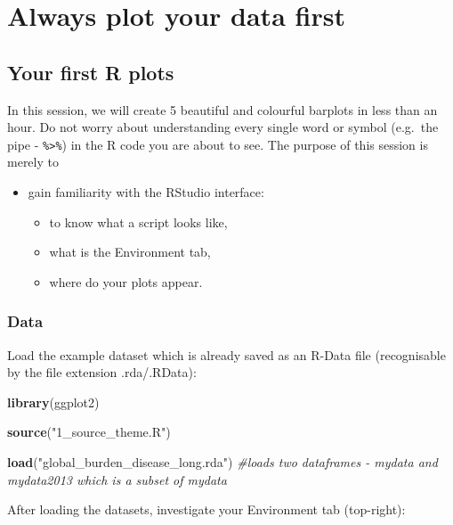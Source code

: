 \documentclass[]{book}
\makeatletter
\newenvironment{Shaded}{\begin{snugshade}}{\end{snugshade}}
\newcommand{\KeywordTok}[1]{\textcolor[rgb]{0.13,0.29,0.53}{\textbf{#1}}}
\newcommand{\StringTok}[1]{\textcolor[rgb]{0.31,0.60,0.02}{#1}}
\newcommand{\CommentTok}[1]{\textcolor[rgb]{0.56,0.35,0.01}{\textit{#1}}}
\newcommand{\NormalTok}[1]{#1}
\providecommand{\tightlist}{%
  \setlength{\itemsep}{0pt}\setlength{\parskip}{0pt}}
\newenvironment{kframe}{%
\medskip{}
\setlength{\fboxsep}{.8em}
 \def\at@end@of@kframe{}%
 \ifinner\ifhmode%
  \def\at@end@of@kframe{\end{minipage}}%
  \begin{minipage}{\columnwidth}%
 \fi\fi%
 \def\FrameCommand##1{\hskip\@totalleftmargin \hskip-\fboxsep
 \colorbox{shadecolor}{##1}\hskip-\fboxsep
     \hskip-\linewidth \hskip-\@totalleftmargin \hskip\columnwidth}%
 \MakeFramed {\advance\hsize-\width
   \@totalleftmargin\z@ \linewidth\hsize
   \@setminipage}}%
 {\par\unskip\endMakeFramed%
 \at@end@of@kframe}
\renewenvironment{Shaded}{\begin{kframe}}{\end{kframe}}
\makeatother
\begin{document}
\part{Always plot your data
first}\label{part-always-plot-your-data-first}

\chapter{Your first R plots}\label{your-first-r-plots}

In this session, we will create 5 beautiful and colourful barplots in
less than an hour. Do not worry about understanding every single word or
symbol (e.g.~the pipe - \texttt{\%\textgreater{}\%}) in the R code you
are about to see. The purpose of this session is merely to

\begin{itemize}
\tightlist
\item
  gain familiarity with the RStudio interface:

  \begin{itemize}
  \tightlist
  \item
    to know what a script looks like,
  \item
    what is the Environment tab,
  \item
    where do your plots appear.
  \end{itemize}
\end{itemize}

\section{Data}\label{data}

Load the example dataset which is already saved as an R-Data file
(recognisable by the file extension .rda/.RData):

\begin{Shaded}
\begin{Highlighting}[]
\KeywordTok{library}\NormalTok{(ggplot2)}

\KeywordTok{source}\NormalTok{(}\StringTok{"1_source_theme.R"}\NormalTok{)}

\KeywordTok{load}\NormalTok{(}\StringTok{"global_burden_disease_long.rda"}\NormalTok{)}
\CommentTok{#loads two dataframes - mydata and mydata2013 which is a subset of mydata}
\end{Highlighting}
\end{Shaded}

After loading the datasets, investigate your Environment tab
(top-right):
\end{document}
